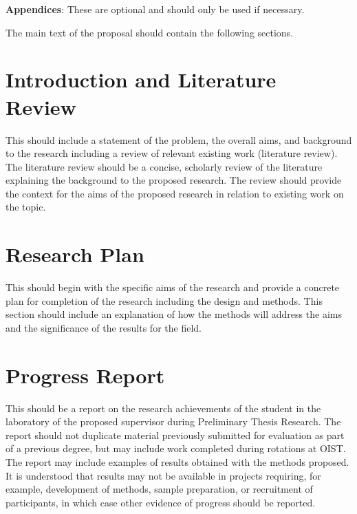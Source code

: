 \textbf{Appendices}: These are optional and should only be used if necessary.

The main text of the proposal should contain the following sections.

\section{Introduction and Literature Review}

This should include a statement of the problem, the overall aims, and background to the research including a review of relevant existing work (literature review). The literature review should be a concise, scholarly review of the literature explaining the background to the proposed research. The review should provide the context for the aims of the proposed research in relation to existing work on the topic.

\section{Research Plan}

 This should begin with the specific aims of the research and provide a concrete plan for completion of the research including the design and methods. This section should include an explanation of how the methods will address the aims and the significance of the results for the field.

\section{Progress Report}

This should be a report on the research achievements of the student in the laboratory of the proposed supervisor during Preliminary Thesis Research. The report should not duplicate material previously submitted for evaluation as part of a previous degree, but may include work completed during rotations at OIST. The report may include examples of results obtained with the methods proposed. It is understood that results may not be available in projects requiring, for example, development of methods, sample preparation, or recruitment of participants, in which case other evidence of progress should be reported.


